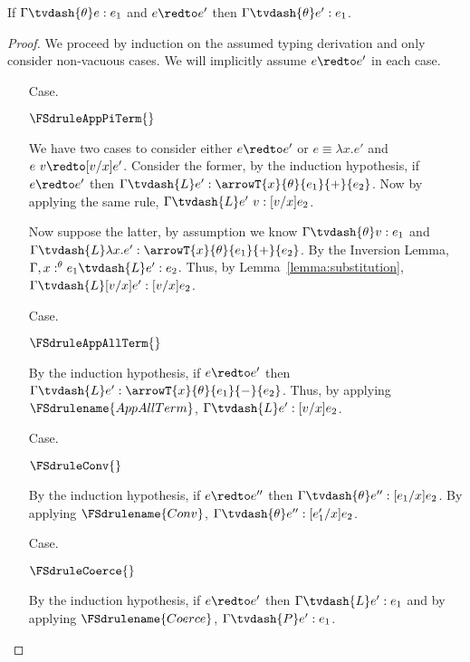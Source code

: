 \begin{thm}[Preservation]
  \label{thm:preservation}
  If $\Gamma \tvdash{\theta} e:e_1$ and $e \redto e'$ then $\Gamma \tvdash{\theta} e':e_1$.
\end{thm}
\begin{proof}
  We proceed by induction on the assumed typing derivation and only consider non-vacuous 
  cases.  We will implicitly assume $e \redto e'$ in each case.

  \begin{itemize}
  \item[Case.]\ \\
    \begin{center}
      $\FSdruleAppPiTerm{}$
    \end{center}
    We have two cases to consider either $e \redto e'$ or $e \equiv \lambda x.e'$
    and $e\ v \redto [v/x]e'$.  Consider the former, by the induction hypothesis, if 
    $e \redto e'$ then 
    $\Gamma \tvdash{L} e':\arrowT{x}{\theta}{e_1}{+}{e_2}$.  Now by applying the same
    rule, $\Gamma \tvdash{L} e'\ v:[v/x]e_2$.
    
    \noindent
    Now suppose the latter, by assumption we know $\Gamma \tvdash{\theta} v:e_1$ and
    $\Gamma \tvdash{L} \lambda x.e':\arrowT{x}{\theta}{e_1}{+}{e_2}$. By the Inversion Lemma, 
    $\Gamma,x:^\theta e_1 \tvdash{L} e':e_2$.  Thus, by Lemma~\ref{lemma:substitution},
    $\Gamma \tvdash{L}[v/x]e':[v/x]e_2$.

  \item[Case.]\ \\
    \begin{center}
      $\FSdruleAppAllTerm{}$
    \end{center}
    By the induction hypothesis, if $e \redto e'$ then 
    $\Gamma \tvdash{L} e':\arrowT{x}{\theta}{e_1}{-}{e_2}$.  Thus, by applying 
    $\FSdrulename{AppAllTerm}$, $\Gamma \tvdash{L} e':[v/x]e_2$.
    
  \item[Case.]\ \\
    \begin{center}
      $\FSdruleConv{}$
    \end{center}
    By the induction hypothesis, if $e \redto e''$ then $\Gamma \tvdash{\theta} e'':[e_1/x]e_2$.
    By applying $\FSdrulename{Conv}$, $\Gamma \tvdash{\theta} e'':[e'_1/x]e_2$.

  \item[Case.]\ \\
    \begin{center}
      $\FSdruleCoerce{}$
    \end{center}
    By the induction hypothesis, if $e \redto e'$ then $\Gamma \tvdash{L} e':e_1$ and by applying
    $\FSdrulename{Coerce}$, $\Gamma \tvdash{P} e':e_1$.
    

\end{itemize}
\end{proof}
